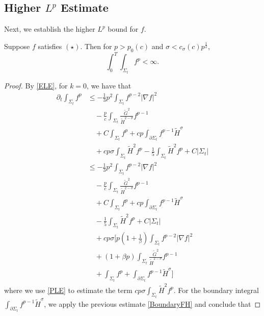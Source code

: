 \subsection{Higher $L^p$ Estimate}
Next, we establish the higher $L^p$ bound for $f$.

\begin{lemma}
    Suppose $f$ satisfies $(\star)$. Then for $p>p_0(c)$ and $\sigma < c_{\sigma }(c)p^{\frac{1}{2}}$,
    \[\int_{0}^{T}\int_{\Sigma_t} f^p<\infty .\]  
\end{lemma}

\begin{proof}
    By \autoref{ELE}, for $k=0$, we have that
    \begin{equation}
    \begin{split}
        \partial_t \int_{\Sigma_t} f^p
        &\leq   -\frac{1}{3}p^2 \int_{\Sigma_t} f^{p-2}\left| \nabla f \right| ^2  \\
        & \quad -\frac{p}{c} \int_{\Sigma_t} \frac{\tilde{G}^2}{\tilde{H}^{2-\sigma }}f^{p-1}\\
        &\quad +C \int_{\Sigma_t} f^p+cp\int_{\partial \Sigma_t} f^{p-1}\tilde{H}^{\sigma }\\
        &\quad +cp \sigma \int_{\Sigma_t}^{}\tilde{H}^2f^p-\frac{1}{5}\int_{\Sigma_t} \tilde{H}^2f^{p}+C \left| \Sigma_t \right| \\
        &\leq   -\frac{1}{3}p^2 \int_{\Sigma_t} f^{p-2}\left| \nabla f \right| ^2  \\
        & \quad -\frac{p}{c} \int_{\Sigma_t} \frac{\tilde{G}^2}{\tilde{H}^{2-\sigma }}f^{p-1}\\
        &\quad +C \int_{\Sigma_t} f^p+cp\int_{\partial \Sigma_t} f^{p-1}\tilde{H}^{\sigma }\\
        &\quad -\frac{1}{5}\int_{\Sigma_t} \tilde{H}^2f^{p}+C \left| \Sigma_t \right| \\
        &\quad +cp \sigma [ p \left( 1+\frac{1}{\beta } \right) \int_{\Sigma_t} f^{p-2}\left| \nabla f \right| ^2   \\
        &\quad +\left( 1+\beta p \right) \int_{\Sigma_t} \frac{\tilde{G}^2}{\tilde{H}^{2-\sigma }}f^{p-1} \\
        &\quad +\int_{\Sigma_t} f^p+\int_{\partial \Sigma_t} f^{p-1}\tilde{H}^{\sigma } ] 
    \end{split}
    \end{equation} 
    where we use \autoref{PLE} to estimate the term $cp \sigma \int_{\Sigma_t}^{}\tilde{H}^2f^p$.
    For the boundary integral $\int_{\partial \Sigma_t} f^{p-1}\tilde{H}^{\sigma }$, we apply the previous estimate \autoref{BoundaryFH} and conclude that 

\end{proof}
